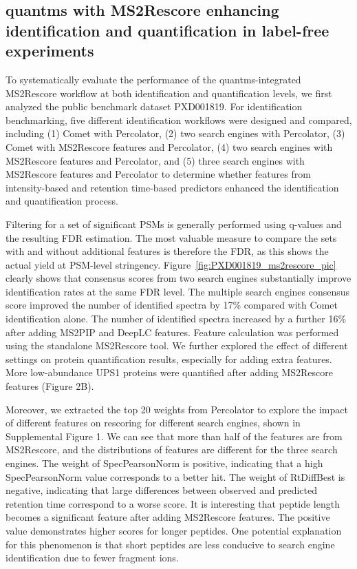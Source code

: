 \documentclass[12pt]{article}
\begin{document}
\subsection{quantms with MS2Rescore enhancing identification and quantification in label-free experiments}
To systematically evaluate the performance of the quantms-integrated MS2Rescore workflow at both identification and quantification levels, we first analyzed the public benchmark dataset PXD001819. For identification benchmarking, five different identification workflows were designed and compared, including (1) Comet with Percolator, (2) two search engines with Percolator, (3) Comet with MS2Rescore features and Percolator, (4) two search engines with MS2Rescore features and Percolator, and (5) three search engines with MS2Rescore features and Percolator to determine whether features from intensity-based and retention time-based predictors enhanced the identification and quantification process.

Filtering for a set of significant PSMs is generally performed using q-values and the resulting FDR estimation. The most valuable measure to compare the sets with and without additional features is therefore the FDR, as this shows the actual yield at PSM-level stringency. Figure~\ref{fig:PXD001819_ms2rescore_pic} clearly shows that consensus scores from two search engines substantially improve identification rates at the same FDR level. The multiple search engines consensus score improved the number of identified spectra by 17\% compared with Comet identification alone. The number of identified spectra increased by a further 16\% after adding MS2PIP and DeepLC features. Feature calculation was performed using the standalone MS2Rescore tool. We further explored the effect of different settings on protein quantification results, especially for adding extra features. More low-abundance UPS1 proteins were quantified after adding MS2Rescore features (Figure 2B).

Moreover, we extracted the top 20 weights from Percolator to explore the impact of different features on rescoring for different search engines, shown in Supplemental Figure 1. We can see that more than half of the features are from MS2Rescore, and the distributions of features are different for the three search engines. The weight of SpecPearsonNorm is positive, indicating that a high SpecPearsonNorm value corresponds to a better hit. The weight of RtDiffBest is negative, indicating that large differences between observed and predicted retention time correspond to a worse score. It is interesting that peptide length becomes a significant feature after adding MS2Rescore features. The positive value demonstrates higher scores for longer peptides. One potential explanation for this phenomenon is that short peptides are less conducive to search engine identification due to fewer fragment ions.
\end{document}
